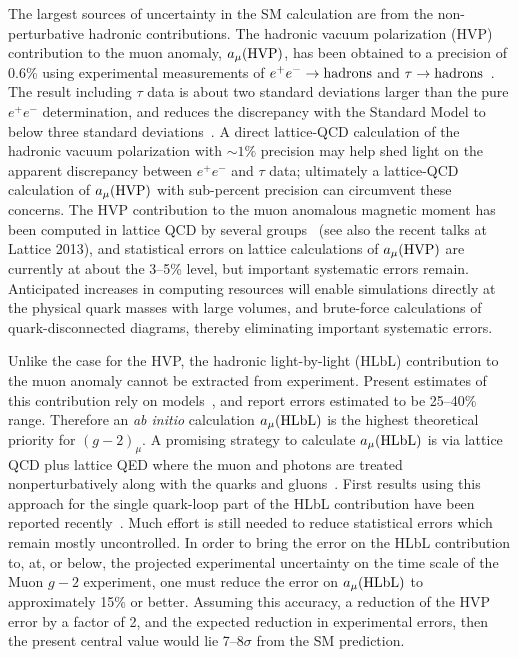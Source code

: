 \begin{itemize}
The largest sources of uncertainty in the SM calculation are from the
non-perturbative hadronic contributions.  The hadronic vacuum polarization
(HVP) contribution to the muon anomaly, $a_{\mu}(\rm HVP)$, has been obtained
to a precision of 0.6\% using experimental measurements of $e^{+}e^{-}\to\rm
hadrons$ and $\tau\to\rm hadrons$~\cite{Davier:2010nc,Hagiwara:2011af}.  The
result including $\tau$ data is about two standard deviations larger than the
pure $e^+e^-$ determination, and reduces the discrepancy with the Standard
Model to below three standard deviations~\cite{Davier:2010nc}.  A direct
lattice-QCD calculation of the hadronic vacuum polarization with $\sim 1\%$
precision may help shed light on the apparent discrepancy between $e^{+}e^{-}$
and $\tau$ data; ultimately a lattice-QCD calculation of $a_{\mu}(\rm HVP)$
with sub-percent precision can circumvent these concerns.  The HVP
contribution to the muon anomalous magnetic moment has been computed in
lattice QCD by several
groups~\cite{Blum:2002ii,Gockeler:2003cw,Aubin:2006xv,Feng:2011zk,Boyle:2011hu,DellaMorte:2011aa}
(see also the recent talks at Lattice 2013), and statistical errors on lattice
calculations of $a_{\mu}(\rm HVP)$ are currently at about the 3--5\% level,
but important systematic errors remain. Anticipated increases in computing
resources will enable simulations directly at the physical quark masses with
large volumes, and brute-force calculations of quark-disconnected diagrams,
thereby eliminating important systematic errors.

Unlike the case for the HVP, the hadronic light-by-light (HLbL) contribution
to the muon anomaly cannot be extracted from experiment. Present estimates of
this contribution rely on models~\cite{Prades:2009tw,Nyffeler:2009tw}, and
report errors estimated to be 25--40\% range.  Therefore an \emph{ab initio}
calculation $a_\mu({\rm HLbL})$ is the highest theoretical priority for
$(g-2)_\mu$.  A promising strategy to calculate $a_\mu({\rm HLbL})$ is via
lattice QCD plus lattice QED where the muon and photons are treated
nonperturbatively along with the quarks and gluons~\cite{Hayakawa:2005eq}.
First results using this approach for the single quark-loop part of the HLbL
contribution have been reported recently~\cite{Blum:2013qu}.  Much effort is
still needed to reduce statistical errors which remain mostly uncontrolled.
In order to bring the error on the HLbL contribution to, at, or below, the
projected experimental uncertainty on the time scale of the Muon $g-2$
experiment, one must reduce the error on $a_\mu({\rm HLbL})$ to approximately
15\% or better.  Assuming this accuracy, a reduction of the HVP error by a
factor of 2, and the expected reduction in experimental errors, then the
present central value would lie 7--8$\sigma$ from the SM prediction.


\end{itemize}
